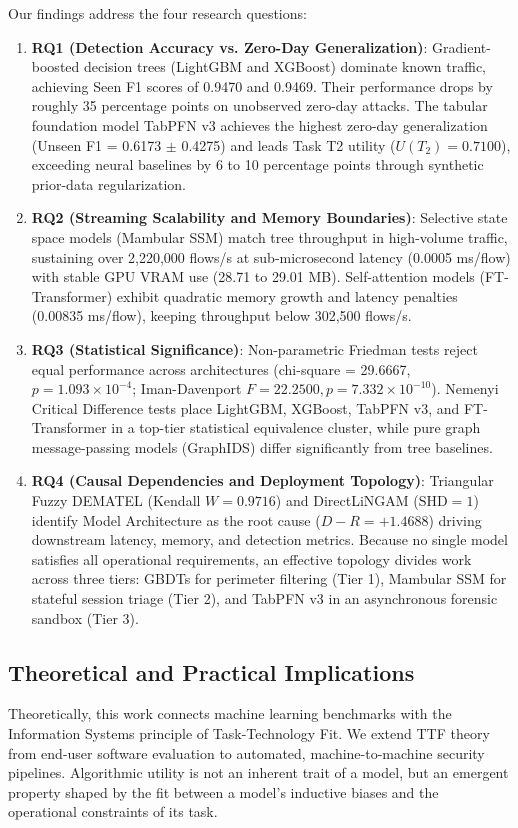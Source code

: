 \documentclass[10pt,a4paper]{article}
\begin{document}
Our findings address the four research questions:
\begin{enumerate}
    \item \textbf{RQ1 (Detection Accuracy vs. Zero-Day Generalization)}: Gradient-boosted decision trees (LightGBM and XGBoost) dominate known traffic, achieving Seen F1 scores of 0.9470 and 0.9469. Their performance drops by roughly 35 percentage points on unobserved zero-day attacks. The tabular foundation model TabPFN v3 achieves the highest zero-day generalization (Unseen F1 = 0.6173 $\pm$ 0.4275) and leads Task T2 utility ($U(T_2) = 0.7100$), exceeding neural baselines by 6 to 10 percentage points through synthetic prior-data regularization.
    \item \textbf{RQ2 (Streaming Scalability and Memory Boundaries)}: Selective state space models (Mambular SSM) match tree throughput in high-volume traffic, sustaining over 2,220,000 flows/s at sub-microsecond latency (0.0005 ms/flow) with stable GPU VRAM use (28.71 to 29.01 MB). Self-attention models (FT-Transformer) exhibit quadratic memory growth and latency penalties (0.00835 ms/flow), keeping throughput below 302,500 flows/s.
    \item \textbf{RQ3 (Statistical Significance)}: Non-parametric Friedman tests reject equal performance across architectures (chi-square = 29.6667, $p = 1.093 \times 10^{-4}$; Iman-Davenport $F = 22.2500, p = 7.332 \times 10^{-10}$). Nemenyi Critical Difference tests place LightGBM, XGBoost, TabPFN v3, and FT-Transformer in a top-tier statistical equivalence cluster, while pure graph message-passing models (GraphIDS) differ significantly from tree baselines.
    \item \textbf{RQ4 (Causal Dependencies and Deployment Topology)}: Triangular Fuzzy DEMATEL (Kendall $W = 0.9716$) and DirectLiNGAM ($\text{SHD} = 1$) identify Model Architecture as the root cause ($D-R = +1.4688$) driving downstream latency, memory, and detection metrics. Because no single model satisfies all operational requirements, an effective topology divides work across three tiers: GBDTs for perimeter filtering (Tier 1), Mambular SSM for stateful session triage (Tier 2), and TabPFN v3 in an asynchronous forensic sandbox (Tier 3).
\end{enumerate}

\subsection*{Theoretical and Practical Implications}
Theoretically, this work connects machine learning benchmarks with the Information Systems principle of Task-Technology Fit. We extend TTF theory from end-user software evaluation to automated, machine-to-machine security pipelines. Algorithmic utility is not an inherent trait of a model, but an emergent property shaped by the fit between a model's inductive biases and the operational constraints of its task.
\end{document}
